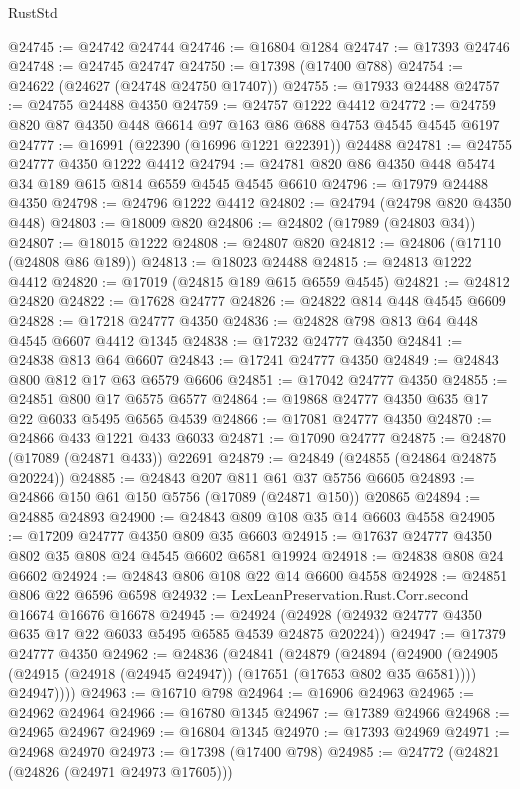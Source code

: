 \begin{lexlean}{RustStd}
\begin{coremodule}
@24745 := @24742 @24744
@24746 := @16804 @1284
@24747 := @17393 @24746
@24748 := @24745 @24747
@24750 := @17398 (@17400 @788)
@24754 := @24622 (@24627 (@24748 @24750 @17407))
@24755 := @17933 @24488
@24757 := @24755 @24488 @4350
@24759 := @24757 @1222 @4412
@24772 := @24759 @820 @87 @4350 @448 @6614 @97 @163 @86 @688 @4753 @4545 @4545 @6197
@24777 := @16991 (@22390 (@16996 @1221 @22391)) @24488
@24781 := @24755 @24777 @4350 @1222 @4412
@24794 := @24781 @820 @86 @4350 @448 @5474 @34 @189 @615 @814 @6559 @4545 @4545 @6610
@24796 := @17979 @24488 @4350
@24798 := @24796 @1222 @4412
@24802 := @24794 (@24798 @820 @4350 @448)
@24803 := @18009 @820
@24806 := @24802 (@17989 (@24803 @34))
@24807 := @18015 @1222
@24808 := @24807 @820
@24812 := @24806 (@17110 (@24808 @86 @189))
@24813 := @18023 @24488
@24815 := @24813 @1222 @4412
@24820 := @17019 (@24815 @189 @615 @6559 @4545)
@24821 := @24812 @24820
@24822 := @17628 @24777
@24826 := @24822 @814 @448 @4545 @6609
@24828 := @17218 @24777 @4350
@24836 := @24828 @798 @813 @64 @448 @4545 @6607 @4412 @1345
@24838 := @17232 @24777 @4350
@24841 := @24838 @813 @64 @6607
@24843 := @17241 @24777 @4350
@24849 := @24843 @800 @812 @17 @63 @6579 @6606
@24851 := @17042 @24777 @4350
@24855 := @24851 @800 @17 @6575 @6577
@24864 := @19868 @24777 @4350 @635 @17 @22 @6033 @5495 @6565 @4539
@24866 := @17081 @24777 @4350
@24870 := @24866 @433 @1221 @433 @6033
@24871 := @17090 @24777
@24875 := @24870 (@17089 (@24871 @433)) @22691
@24879 := @24849 (@24855 (@24864 @24875 @20224))
@24885 := @24843 @207 @811 @61 @37 @5756 @6605
@24893 := @24866 @150 @61 @150 @5756 (@17089 (@24871 @150)) @20865
@24894 := @24885 @24893
@24900 := @24843 @809 @108 @35 @14 @6603 @4558
@24905 := @17209 @24777 @4350 @809 @35 @6603
@24915 := @17637 @24777 @4350 @802 @35 @808 @24 @4545 @6602 @6581 @19924
@24918 := @24838 @808 @24 @6602
@24924 := @24843 @806 @108 @22 @14 @6600 @4558
@24928 := @24851 @806 @22 @6596 @6598
@24932 := LexLeanPreservation.Rust.Corr.second @16674 @16676 @16678
@24945 := @24924 (@24928 (@24932 @24777 @4350 @635 @17 @22 @6033 @5495 @6585 @4539 @24875 @20224))
@24947 := @17379 @24777 @4350
@24962 := @24836
    (@24841
      (@24879
        (@24894
          (@24900
            (@24905 (@24915 (@24918 (@24945 @24947)) (@17651 (@17653 @802 @35 @6581))))
            @24947))))
@24963 := @16710 @798
@24964 := @16906 @24963
@24965 := @24962 @24964
@24966 := @16780 @1345
@24967 := @17389 @24966
@24968 := @24965 @24967
@24969 := @16804 @1345
@24970 := @17393 @24969
@24971 := @24968 @24970
@24973 := @17398 (@17400 @798)
@24985 := @24772
    (@24821 (@24826 (@24971 @24973 @17605)))

\end{coremodule}
\end{lexlean}

